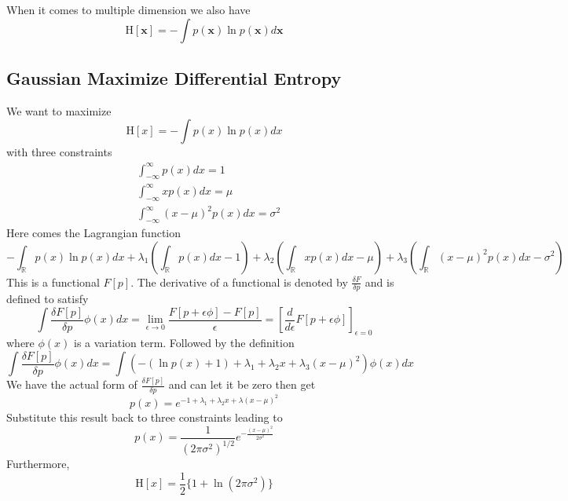 \documentclass{article}
\begin{document}
            When it comes to multiple dimension we also have
            \[
                \mathrm{H}[\mathbf{x}]=-\int p(\mathbf{x})\ln p(\mathbf{x})d\mathbf{x}
            \]
        \subsection{Gaussian Maximize Differential Entropy}
            We want to maximize
            \[
                \mathrm{H}[x]=-\int p(x)\ln p(x)dx
            \]
            with three constraints
            \begin{align*}
                &\int_{-\infty}^\infty p(x)dx=1\\
                &\int_{-\infty}^\infty xp(x)dx=\mu\\
                &\int_{-\infty}^\infty (x-\mu)^2p(x)dx=\sigma^2
            \end{align*}
            Here comes the Lagrangian function
            \[
                -\int_{\mathbb{R}}p(x)\ln p(x)dx + \lambda_1\left(\int_{\mathbb{R}}p(x)dx-1\right) + \lambda_2\left(\int_{\mathbb{R}}xp(x)dx-\mu\right)+\lambda_3\left(\int_{\mathbb{R}}(x-\mu)^2p(x)dx-\sigma^2\right)
            \]
            This is a functional $F[p]$. The derivative of a functional is denoted by $\frac{\delta F}{\delta p}$ and is defined to satisfy
            \[
                \int\frac{\delta F[p]}{\delta p}\phi(x)dx = \lim_{\epsilon\rightarrow0}\frac{F[p+\epsilon\phi]-F[p]}{\epsilon}=\left[\frac{d}{d\epsilon}F[p+\epsilon\phi]\right]_{\epsilon=0}
            \]
            where $\phi(x)$ is a variation term. Followed by the definition
            \[
                \int\frac{\delta F[p]}{\delta p}\phi(x)dx=\int\left(-(\ln p(x)+1)+\lambda_1+\lambda_2x+\lambda_3(x-\mu)^2\right)\phi(x)dx
            \]
            We have the actual form of $\frac{\delta F[p]}{\delta p}$ and can let it be zero then get
            \[
                p(x)=e^{-1+\lambda_1+\lambda_2x+\lambda(x-\mu)^2}
            \]
            Substitute this result back to three constraints leading to
            \[
                p(x)=\frac{1}{(2\pi\sigma^2)^{1/2}}e^{-\frac{(x-\mu)^2}{2\sigma^2}}
            \]
            Furthermore,
            \[
                \mathrm{H}[x] = \frac{1}{2}\{1+\ln(2\pi\sigma^2)\}
            \]
        
\end{document}
